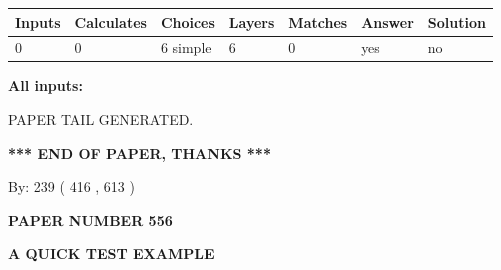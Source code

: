 \documentclass[12pt]{article}
\begin{document}
 
\noindent{}
 
 
   
   
   
   
\noindent\begin{tabular}{|l|l|l|l|l|l|l|}
 \hline
Inputs & Calculates & Choices & Layers & Matches & Answer & Solution \\ \hline
 0  & 
 0  & 
 6
  simple  
  & 
 6  & 
 0  & 
  yes & 
  no 
  \\ \hline
 \end{tabular}
   
   
   
   
\noindent{}
   
   
   
   
\noindent\vspace{0.1in}\hspace{-0.08in} {\textbf{\Large{All inputs: }}}
   
   
   
   
   
   
 \vspace{0.2in}
 
   
   
\vspace{2.0in} PAPER TAIL GENERATED.
   
   
   
   
\vspace{1.0in} 
{\textbf{\large{ *** END OF PAPER, THANKS *** }}} 
   
   
\hspace{1.0in} By: 
 239 ( 416 ,  613 )
   
   
   
   
\newpage 
\setcounter{page}{ 
   556001 } 
   
   
   
   
 {\textbf{ \Large{ PAPER NUMBER  556  }}}
   
   
\vspace{0.2in}
   
   
   
   
   
   
   
   
 \vspace{0.2in}
{\LARGE {\textbf{ A QUICK TEST EXAMPLE}}}
   
\end{document}
